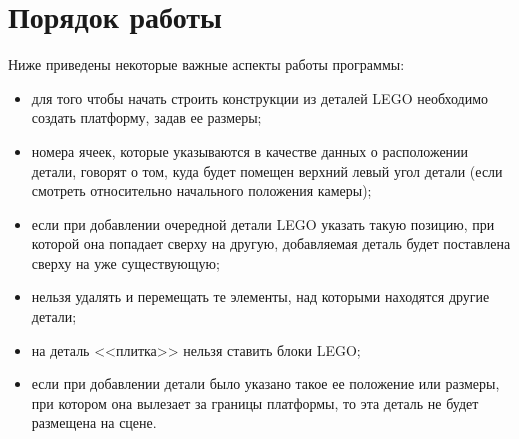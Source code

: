\FloatBarrier
{}
\FloatBarrier
{}
\FloatBarrier
{}
\FloatBarrier
{}
\FloatBarrier
{}
\FloatBarrier
{}
\FloatBarrier
{}
\FloatBarrier
{}
\FloatBarrier
{}
\FloatBarrier
{}
\FloatBarrier

\section{Порядок работы}

Ниже приведены некоторые важные аспекты работы программы:
\begin{itemize}[label=---]
    \item для того чтобы начать строить конструкции из деталей LEGO необходимо создать платформу, задав ее размеры;
    \item номера ячеек, которые указываются в качестве данных о расположении детали, говорят о том, куда будет помещен верхний левый угол детали (если смотреть относительно начального положения камеры);
    \item если при добавлении очередной детали LEGO указать такую позицию, при которой она попадает сверху на другую, добавляемая деталь будет поставлена сверху на уже существующую;
    \item нельзя удалять и перемещать те элементы, над которыми находятся другие детали;
    \item на деталь <<плитка>> нельзя ставить блоки LEGO;
    \item если при добавлении детали было указано такое ее положение или размеры, при котором она вылезает за границы платформы, то эта деталь не будет размещена на сцене.
\end{itemize}



